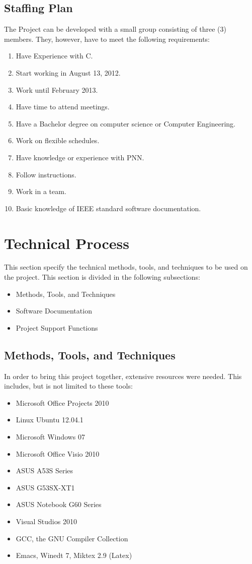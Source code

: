 \documentclass[12pt]{article}
\begin{document}
\subsection{Staffing Plan}
The Project can be developed with a small group consisting of three (3) members. They, however, have to meet the following requirements:
\begin{enumerate}
  \item Have Experience with C.
  \item Start working in August 13, 2012.
  \item Work until February 2013.
  \item Have time to attend meetings.
  \item Have a Bachelor degree on computer science or Computer Engineering.
  \item Work on flexible schedules.
  \item Have knowledge or experience with PNN.
  \item Follow instructions.
  \item Work in a team.
  \item Basic knowledge of IEEE standard software documentation.
\end{enumerate}

\section{Technical Process}
This section specify the technical methods, tools, and techniques to be used on the project. This section is divided in the following subsections:
\begin{itemize}
  \item Methods, Tools, and Techniques
  \item Software Documentation
  \item Project Support Functions
\end{itemize}

\subsection{Methods, Tools, and Techniques}
In order to bring this project together, extensive resources were needed. This includes, but is not limited to these tools:

\begin{itemize}
  \item Microsoft Office Projects 2010
  \item Linux Ubuntu 12.04.1
  \item Microsoft Windows 07
  \item Microsoft Office Visio 2010
  \item ASUS A53S Series
  \item ASUS G53SX-XT1
  \item ASUS Notebook G60 Series
  \item Visual Studios 2010
  \item GCC, the GNU Compiler Collection
  \item Emacs, Winedt 7, Miktex 2.9 (Latex)
\end{itemize}
\end{document}
